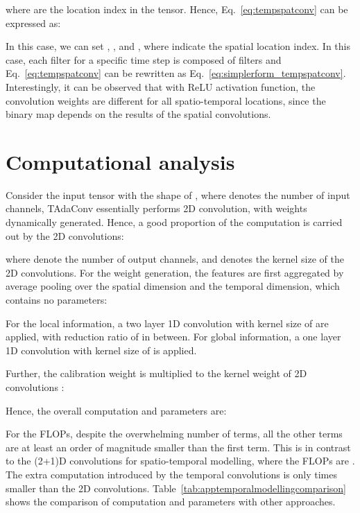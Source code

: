 \documentclass{article} \usepackage{iclr2022_conference,times}
\begin{document}
\noindent where  are the location index in the tensor.
Hence, Eq.~\ref{eq:tempspatconv} can be expressed as:

\noindent In this case, we can set , , and , where  indicate the spatial location index.
In this case, each filter for a specific time step  is composed of  filters and Eq.~\ref{eq:tempspatconv} can be rewritten as Eq.~\ref{eq:simplerform_tempspatconv}. 
Interestingly, it can be observed that with ReLU activation function, the convolution weights are different for all spatio-temporal locations, since the binary map  depends on the results of the spatial convolutions. 

\section{Computational analysis}
\label{appendix:companalysis}
Consider the input tensor with the shape of , where  denotes the number of input channels, TAdaConv essentially performs 2D convolution, with weights dynamically generated. Hence, a good proportion of the computation is carried out by the 2D convolutions:


\noindent where  denote the number of output channels, and  denotes the kernel size of the 2D convolutions. For the weight generation, the features are first aggregated by average pooling over the spatial dimension and the temporal dimension, which contains no parameters:

For the local information, a two layer 1D convolution with kernel size of  are applied, with reduction ratio of  in between. For global information, a one layer 1D convolution with kernel size of  is applied.

Further, the calibration weight  is multiplied to the kernel weight of 2D convolutions :

Hence, the overall computation and parameters are:


For the FLOPs, despite the overwhelming number of terms, all the other terms are at least an order of magnitude smaller than the first term. This is in contrast to the (2+1)D convolutions for spatio-temporal modelling, where the FLOPs are . The extra computation introduced by the temporal convolutions is only  times smaller than the 2D convolutions. 
Table~\ref{tab:apptemporalmodellingcomparison} shows the comparison of computation and parameters with other approaches.
\end{document}

